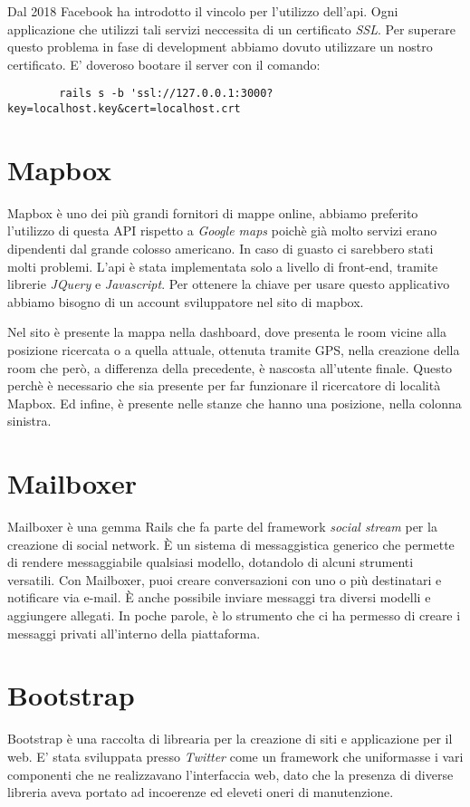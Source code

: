 	Dal 2018 Facebook ha introdotto il vincolo  per l'utilizzo dell'api. Ogni applicazione che utilizzi tali servizi neccessita di un certificato \textit{SSL}. Per superare questo problema in fase di development abbiamo dovuto utilizzare un nostro certificato. E' doveroso bootare il server con il comando:
	\begin{lstlisting}
		rails s -b 'ssl://127.0.0.1:3000?key=localhost.key&cert=localhost.crt
	\end{lstlisting}
	
	\section{Mapbox}
	Mapbox è uno dei più grandi fornitori di mappe online, abbiamo preferito l'utilizzo di questa API rispetto a \textit{Google maps} poichè già molto servizi erano dipendenti dal grande colosso americano. In caso di guasto ci sarebbero stati molti problemi. L'api è stata implementata solo a livello di front-end, tramite librerie \textit{JQuery} e \textit{Javascript}. Per ottenere la chiave per usare questo applicativo abbiamo bisogno di un account sviluppatore nel sito di mapbox.
	
	Nel sito è presente la mappa nella dashboard, dove presenta le room vicine alla posizione ricercata o a quella attuale, ottenuta tramite GPS, nella creazione della room che però, a differenza della precedente, è nascosta all'utente finale. Questo perchè è necessario che sia presente per far funzionare il ricercatore di località Mapbox. Ed infine, è presente nelle stanze che hanno una posizione, nella colonna sinistra. 
	
	\section{Mailboxer}
	Mailboxer è una gemma Rails che fa parte del framework \textit{social stream} per la creazione di social network. È un sistema di messaggistica generico che permette di rendere messaggiabile qualsiasi modello, dotandolo di alcuni strumenti versatili. Con Mailboxer, puoi creare conversazioni con uno o più destinatari e notificare via e-mail. È anche possibile inviare messaggi tra diversi modelli e aggiungere allegati. In poche parole, è lo strumento che ci ha permesso di creare i messaggi privati all'interno della piattaforma.
	
	\section{Bootstrap}
	Bootstrap è una raccolta di librearia per la creazione di siti e applicazione per il web. E' stata sviluppata presso \textit{Twitter} come un framework che uniformasse i vari componenti che ne realizzavano l'interfaccia web, dato che la presenza di diverse libreria aveva portato ad incoerenze ed eleveti oneri di manutenzione.
	
